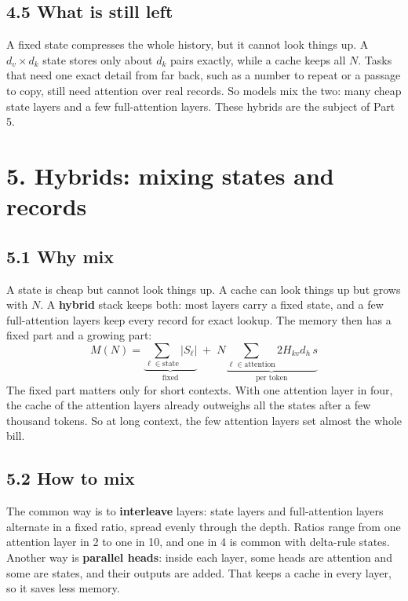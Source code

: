 \documentclass[11pt]{article}
\begin{document}
\subsection{4.5 What is still left}

A fixed state compresses the whole history, but it cannot look things up. A \(d_v\times d_k\) state stores only about \(d_k\) pairs exactly, while a cache keeps all \(N\). Tasks that need one exact detail from far back, such as a number to repeat or a passage to copy, still need attention over real records. So models mix the two: many cheap state layers and a few full-attention layers. These hybrids are the subject of Part 5.

\section{5. Hybrids: mixing states and records}

\subsection{5.1 Why mix}

A state is cheap but cannot look things up. A cache can look things up but grows with \(N\). A \textbf{hybrid} stack keeps both: most layers carry a fixed state, and a few full-attention layers keep every record for exact lookup. The memory then has a fixed part and a growing part:
\[
M(N)=\underbrace{\sum_{\ell\in\text{state}}|S_\ell|}_{\text{fixed}}\;+\;N\underbrace{\sum_{\ell\in\text{attention}}2H_{kv}d_h\,s}_{\text{per token}}
\]
The fixed part matters only for short contexts. With one attention layer in four, the cache of the attention layers already outweighs all the states after a few thousand tokens. So at long context, the few attention layers set almost the whole bill.

\subsection{5.2 How to mix}

The common way is to \textbf{interleave} layers: state layers and full-attention layers alternate in a fixed ratio, spread evenly through the depth. Ratios range from one attention layer in 2 to one in 10, and one in 4 is common with delta-rule states. Another way is \textbf{parallel heads}: inside each layer, some heads are attention and some are states, and their outputs are added. That keeps a cache in every layer, so it saves less memory.
\end{document}
